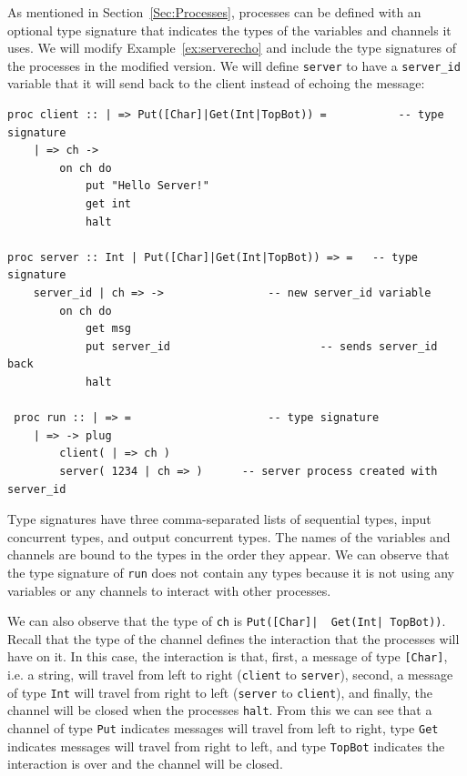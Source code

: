 \documentclass[11pt]{article}
\begin{document}
As mentioned in Section~\ref{Sec:Processes}, processes can be defined with an optional type 
signature that indicates the types of the variables and channels it uses.
We will modify Example~\ref{ex:serverecho} and include the type signatures of the processes in the modified version.
We will define \lstinline$server$ to have a \lstinline$server_id$ variable that it will send back to the client instead of echoing the message:
\begin{lstlisting}[label=ex:serverid, caption=Server replies to Client with server id] 
proc client :: | => Put([Char]|Get(Int|TopBot)) = 			-- type signature
	| => ch ->
		on ch do 
			put "Hello Server!"	
			get int					
			halt

proc server :: Int | Put([Char]|Get(Int|TopBot)) => = 	-- type signature
	server_id | ch => ->				-- new server_id variable
		on ch do
			get msg							
			put server_id						-- sends server_id back
			halt
			
 proc run :: | => = 					-- type signature
 	| => -> plug					
 		client( | => ch )		
 		server( 1234 | ch => )		-- server process created with server_id
\end{lstlisting}
Type signatures have three comma-separated lists of sequential types, input concurrent types, and output concurrent types.
The names of the variables and channels are bound to the types in the order they appear.
We can observe that the type signature of \lstinline$run$ does not contain any types because it is not using any variables or any channels to interact with other processes.

We can also observe that the type of \lstinline$ch$ is \lstinline$Put([Char]|  Get(Int| TopBot))$.
Recall that the type of the channel defines the interaction that the processes will have on it.
In this case, the interaction is that, first, a message of type \lstinline$[Char]$, i.e. a string, will travel from left to right (\lstinline$client$ to \lstinline$server$), second, a message of type  \lstinline$Int$ will travel from right to left (\lstinline$server$ to \lstinline$client$), and finally, the channel will be closed when the processes \lstinline$halt$.
From this we can see that a channel of type \lstinline$Put$ indicates messages will travel from left to right, type \lstinline$Get$ indicates messages will travel from right to left, and type \lstinline$TopBot$ indicates the interaction is over and the channel will be closed.
\end{document}
